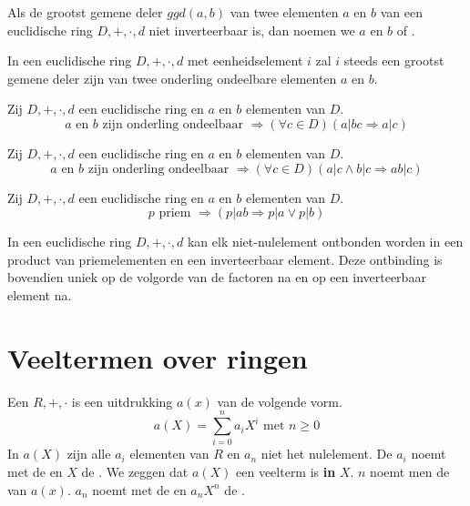 \documentclass[main.tex]{subfiles}
\begin{document}
\begin{de}
  Als de grootst gemene deler $ggd(a,b)$ van twee elementen $a$ en $b$ van een euclidische ring $D,+,\cdot,d$ niet inverteerbaar is, dan noemen we $a$ en $b$  of .
\end{de}

\begin{ei}
  In een euclidische ring $D,+,\cdot,d$ met eenheidselement $i$ zal $i$ steeds een grootst gemene deler zijn van twee onderling ondeelbare elementen $a$ en $b$.
\end{ei}

\begin{st}
  Zij $D,+,\cdot,d$ een euclidische ring en $a$ en $b$ elementen van $D$.
  \[ a \text{ en } b \text{ zijn onderling ondeelbaar } \Rightarrow (\forall c \in D)(a | bc \Rightarrow a|c) \]
\end{st}

\begin{st}
  Zij $D,+,\cdot,d$ een euclidische ring en $a$ en $b$ elementen van $D$.
  \[ a \text{ en } b \text{ zijn onderling ondeelbaar } \Rightarrow (\forall c \in D)(a | c \wedge b | c \Rightarrow ab|c) \]
\end{st}

\begin{st}
  Zij $D,+,\cdot,d$ een euclidische ring en $a$ en $b$ elementen van $D$.
  \[ p \text{ priem } \Rightarrow (p|ab \Rightarrow p|a \vee p|b) \]
\end{st}

\begin{st}
  In een euclidische ring $D,+,\cdot,d$ kan elk niet-nulelement ontbonden worden in een product van priemelementen en een inverteerbaar element.
  Deze ontbinding is bovendien uniek op de volgorde van de factoren na en op een inverteerbaar element na.
\end{st}

\section{Veeltermen over ringen}
\label{sec:veelt-over-ring}

\begin{de}
  Een  $R,+,\cdot$ is een uitdrukking $a(x)$ van de volgende vorm.
  \[ a(X) = \sum_{i=0}^{n}a_{i}X^{i} \text{ met } n \ge 0 \]
  In $a(X)$ zijn alle $a_{i}$ elementen van $R$ en $a_{n}$ niet het nulelement. 
  De $a_{i}$ noemt met de  en $X$ de .
  We zeggen dat $a(X)$ een veelterm is \textbf{in} $X$.
  $n$ noemt men de  van $a(x)$.
  $a_{n}$ noemt met de  en $a_{n}X^{n}$ de .
\end{de}
\end{document}

